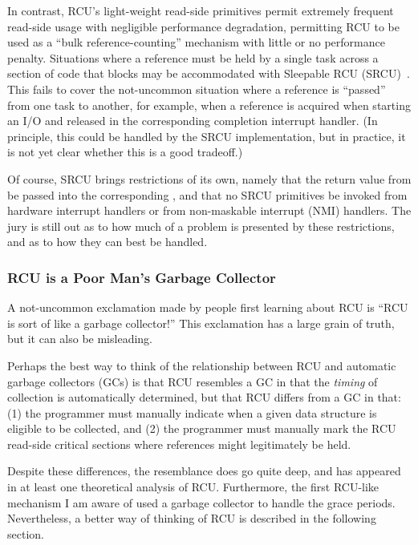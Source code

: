 In contrast, RCU's light-weight read-side primitives permit
extremely frequent read-side usage with negligible performance
degradation, permitting RCU to be used as a ``bulk reference-counting''
mechanism with little or no performance penalty.
Situations where a reference must be held by a single task across a
section of code that blocks may be accommodated with
Sleepable RCU (SRCU)~\cite{PaulEMcKenney2006c}.
This fails to cover the not-uncommon situation where a reference is ``passed''
from one task to another, for example, when a reference is acquired
when starting an I/O and released in the corresponding completion
interrupt handler.
(In principle, this could be handled by the SRCU implementation,
but in practice, it is not yet clear whether this is a good tradeoff.)

Of course, SRCU brings restrictions of its own, namely that the
return value from  be passed into the
corresponding , and that no SRCU primitives
be invoked from hardware interrupt handlers or from non-maskable interrupt
(NMI) handlers.
The jury is still out as to how much of a problem is presented by
these restrictions, and as to how they can best be handled.

\subsubsection{RCU is a Poor Man's Garbage Collector}
\label{sec:defer:RCU is a Poor Man's Garbage Collector}

A not-uncommon exclamation made by people first learning about
RCU is ``RCU is sort of like a garbage collector!''
This exclamation has a large grain of truth, but it can also be
misleading.

Perhaps the best way to think of the relationship between RCU
and automatic garbage collectors (GCs) is that RCU resembles
a GC in that the \emph{timing} of collection is automatically
determined, but that RCU differs from a GC in that: (1) the programmer
must manually indicate when a given data structure is eligible
to be collected, and (2) the programmer must manually mark the
RCU read-side critical sections where references might legitimately
be held.

Despite these differences, the resemblance does go quite deep,
and has appeared in at least one theoretical analysis of RCU.
Furthermore, the first RCU-like mechanism I am aware of used
a garbage collector to handle the grace periods.
Nevertheless, a better way of thinking of RCU is described in the
following section.


